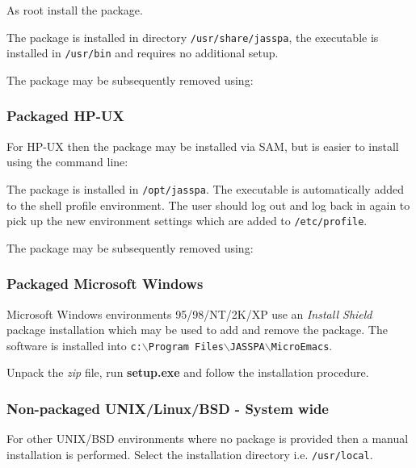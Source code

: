 \documentclass[11pt,a4paper,pdftex]{article}
\begin{document}
  As root install the package.


  The package is installed in directory \texttt{/usr/share/jasspa}, the
  executable is installed in \texttt{/usr/bin} and requires no additional
  setup.

  The package may be subsequently removed using:


\subsubsection{Packaged HP-UX}

  For HP-UX then the package may be installed via SAM, but is easier to
  install using the command line:


  The package is installed in \texttt{/opt/jasspa}. The executable is
  automatically added to the shell profile environment. The user should log
  out and log back in again to pick up the new environment settings which are
  added to \texttt{/etc/profile}.

  The package may be subsequently removed using:


\subsubsection{Packaged Microsoft Windows}

  Microsoft Windows environments 95/98/NT/2K/XP use an \textit{Install Shield}
  package installation which may be used to add and remove the package. The
  software is installed into \texttt{c:$\backslash$Program
  Files\-$\backslash$JASSPA\-$\backslash$MicroEmacs}.

  Unpack the \textit{zip} file, run \textbf{setup.exe} and follow the
  installation procedure.

\subsubsection{Non-packaged UNIX/Linux/BSD - System wide}

  For other UNIX/BSD environments where no package is provided then a manual
  installation is performed. Select the installation directory i.e.
  \texttt{/usr/local}.
\end{document}
